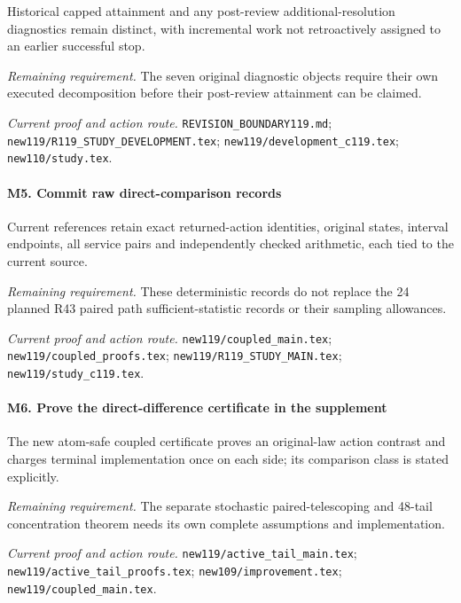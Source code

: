 Historical capped attainment and any post-review additional-resolution diagnostics remain distinct, with incremental work not retroactively assigned to an earlier successful stop.

\par\emph{Remaining requirement.} The seven original diagnostic objects require their own executed decomposition before their post-review attainment can be claimed.

\par\emph{Current proof and action route.} \nolinkurl{REVISION_BOUNDARY119.md}; \nolinkurl{new119/R119_STUDY_DEVELOPMENT.tex}; \nolinkurl{new119/development_c119.tex}; \nolinkurl{new110/study.tex}.

\paragraph{M5. Commit raw direct-comparison records}

Current references retain exact returned-action identities, original states, interval endpoints, all service pairs and independently checked arithmetic, each tied to the current source.

\par\emph{Remaining requirement.} These deterministic records do not replace the 24 planned R43 paired path sufficient-statistic records or their sampling allowances.

\par\emph{Current proof and action route.} \nolinkurl{new119/coupled_main.tex}; \nolinkurl{new119/coupled_proofs.tex}; \nolinkurl{new119/R119_STUDY_MAIN.tex}; \nolinkurl{new119/study_c119.tex}.

\paragraph{M6. Prove the direct-difference certificate in the supplement}

The new atom-safe coupled certificate proves an original-law action contrast and charges terminal implementation once on each side; its comparison class is stated explicitly.

\par\emph{Remaining requirement.} The separate stochastic paired-telescoping and 48-tail concentration theorem needs its own complete assumptions and implementation.

\par\emph{Current proof and action route.} \nolinkurl{new119/active_tail_main.tex}; \nolinkurl{new119/active_tail_proofs.tex}; \nolinkurl{new109/improvement.tex}; \nolinkurl{new119/coupled_main.tex}.

